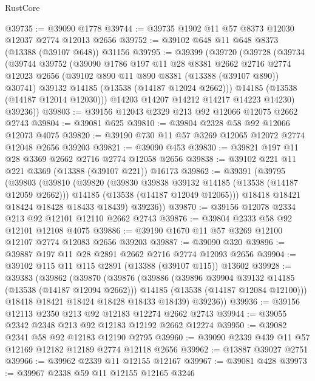 \begin{lexlean}{RustCore}
\begin{coremodule}
@39735 := @39090 @1778
@39744 := @39735 @1902 @11 @57 @8373 @12030 @12037 @2774 @12013 @2656
@39752 := @39102 @648 @11 @648 @8373 (@13388 (@39107 @648)) @31156
@39795 := @39399
    (@39720
      (@39728
        (@39734
          (@39744
            @39752
            (@39090
              @1786
              @197
              @11
              @28
              @8381
              @2662
              @2716
              @2774
              @12023
              @2656
              (@39102 @890 @11 @890 @8381 (@13388 (@39107 @890)) @30741)
              @39132
              @14185
              (@13538 (@14187 @12024 @2662)))
            @14185
            (@13538 (@14187 @12014 @12030)))
          @14203
          @14207
          @14212
          @14217
          @14223
          @14230)
        @39236))
@39803 := @39156 @12043 @2329 @213 @92 @12066 @12075 @2662 @2743
@39804 := @39081 @625
@39810 := @39804 @2328 @58 @92 @12066 @12073 @4075
@39820 := @39190 @730 @11 @57 @3269 @12065 @12072 @2774 @12048 @2656 @39203
@39821 := @39090 @453
@39830 := @39821 @197 @11 @28 @3369 @2662 @2716 @2774 @12058 @2656
@39838 := @39102 @221 @11 @221 @3369 (@13388 (@39107 @221)) @16173
@39862 := @39391
    (@39795
      (@39803
        (@39810
          (@39820
            (@39830 @39838 @39132 @14185 (@13538 (@14187 @12059 @2662)))
            @14185
            (@13538 (@14187 @12049 @12065)))
          @18418
          @18421
          @18424
          @18428
          @18433
          @18439)
        @39236))
@39870 := @39156 @12078 @2334 @213 @92 @12101 @12110 @2662 @2743
@39876 := @39804 @2333 @58 @92 @12101 @12108 @4075
@39886 := @39190 @1670 @11 @57 @3269 @12100 @12107 @2774 @12083 @2656 @39203
@39887 := @39090 @320
@39896 := @39887 @197 @11 @28 @2891 @2662 @2716 @2774 @12093 @2656
@39904 := @39102 @115 @11 @115 @2891 (@13388 (@39107 @115)) @13602
@39928 := @39383
    (@39862
      (@39870
        (@39876
          (@39886
            (@39896 @39904 @39132 @14185 (@13538 (@14187 @12094 @2662)))
            @14185
            (@13538 (@14187 @12084 @12100)))
          @18418
          @18421
          @18424
          @18428
          @18433
          @18439)
        @39236))
@39936 := @39156 @12113 @2350 @213 @92 @12183 @12274 @2662 @2743
@39944 := @39055 @2342 @2348 @213 @92 @12183 @12192 @2662 @12274
@39950 := @39082 @2341 @58 @92 @12183 @12190 @2795
@39960 := @39090 @2339 @439 @11 @57 @12169 @12182 @12189 @2774 @12118 @2656
@39962 := @13887 @39027 @2751
@39966 := @39962 @2339 @11 @12155 @12167
@39967 := @39081 @428
@39973 := @39967 @2338 @59 @11 @12155 @12165 @3246

\end{coremodule}
\end{lexlean}
